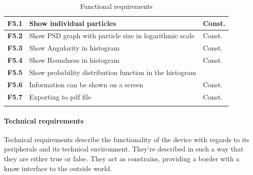 \documentclass[11pt,fleqn,,a4paper,twoside,openright]{book}
\begin{document}
\begin{longtable}{|p{1cm}| p{10cm} p{1.5cm}|}
\hline
\textbf{F5.1}\label{F5.1} & Show individual particles  & Const. \\
\hline
\textbf{F5.2}\label{F5.2} & Show PSD graph with particle size in logarithmic scale  & Const.  \\
\hline
\textbf{F5.3}\label{F5.3} & Show Angularity in histogram  & Const. \\
\hline
\textbf{F5.4}\label{F5.4} & Show Roundness in histogram & Const. \\
\hline
\textbf{F5.5}\label{F5.5} & Show probability distribution function in the histogram &  \\
\hline
\textbf{F5.6}\label{F5.6} & Information can be shown on a screen & Const. \\
\hline
\textbf{F5.7}\label{F5.7} & Exporting to pdf file & Const. \\
\hline
\caption{Functional requirements}\label{tab:FuncReq}
\end{longtable}

\newpage
\paragraph{Technical requirements}
Technical requirements describe the functionality of the device with regards to its peripherals and its technical environment. They're described in such a way that they are either true or false. They act as constrains, providing a border with a know interface to the outside world.
\end{document}
